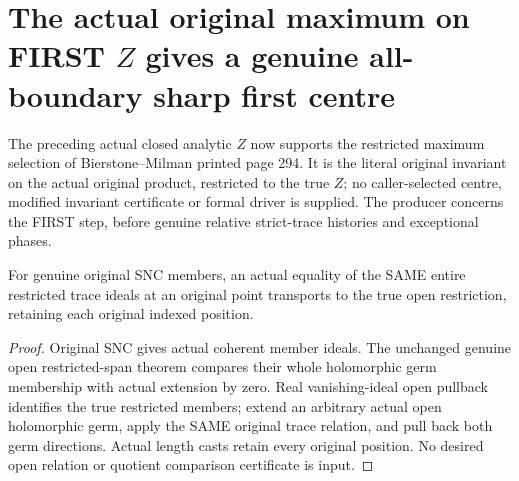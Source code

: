 \section{The actual original maximum on FIRST $Z$ gives a genuine all-boundary sharp first centre}

The preceding actual closed analytic $Z$ now supports the restricted maximum
selection of Bierstone--Milman printed page 294. It is the literal original
invariant on the actual original product, restricted to the true $Z$; no
caller-selected centre, modified invariant certificate or formal driver is
supplied. The producer concerns the FIRST step, before genuine relative
strict-trace histories and exceptional phases.

\begin{lemma}
\label{hir:sharp-original-trace-ideal-open-restriction-relation}
\leanok
For genuine original SNC members, an actual equality of the SAME entire
restricted trace ideals at an original point transports to the true open
restriction, retaining each original indexed position.
\end{lemma}
\begin{proof}
Original SNC gives actual coherent member ideals. The unchanged genuine
open restricted-span theorem compares their whole holomorphic germ membership
with actual extension by zero. Real vanishing-ideal open pullback identifies
the true restricted members; extend an arbitrary actual open holomorphic germ,
apply the SAME original trace relation, and pull back both germ directions.
Actual length casts retain every original position. No desired open relation
or quotient comparison certificate is input.
\end{proof}


